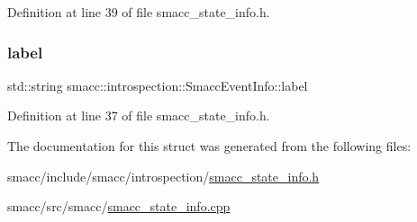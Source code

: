 Definition at line 39 of file smacc\+\_\+state\+\_\+info.\+h.

\mbox{\label{structsmacc_1_1introspection_1_1SmaccEventInfo_a2bbed6ad8013758e23761c92d70c2fd1}} 
\subsubsection{\texorpdfstring{label}{label}}
{\footnotesize\ttfamily std\+::string smacc\+::introspection\+::\+Smacc\+Event\+Info\+::label}



Definition at line 37 of file smacc\+\_\+state\+\_\+info.\+h.



The documentation for this struct was generated from the following files\+:\begin{DoxyCompactItemize}
\item 
smacc/include/smacc/introspection/\hyperlink{smacc__state__info_8h}{smacc\+\_\+state\+\_\+info.\+h}\item 
smacc/src/smacc/\hyperlink{smacc__state__info_8cpp}{smacc\+\_\+state\+\_\+info.\+cpp}\end{DoxyCompactItemize}
